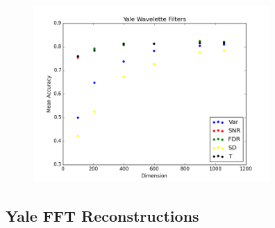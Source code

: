 \documentclass[12pt, letterpaper]{article}
\begin{document}
\begin{center}
	\begin{figure}[H]
		\centering
		\includegraphics[width=9cm, keepaspectratio]{fftAcc/y_filters_wl}
		\label{fig:gfyw}
	\end{figure}
\end{center}

\subsection{Yale FFT Reconstructions}
\end{document}
